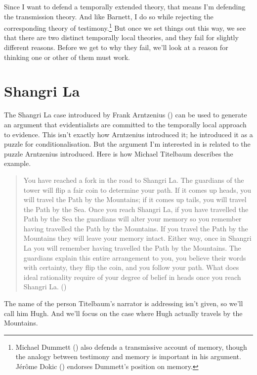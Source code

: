 \documentclass[
  11pt,
  letterpaper,
  DIV=11,
  numbers=noendperiod,
  twoside]{scrartcl}
\begin{document}
Since I want to defend a temporally extended theory, that means I'm
defending the transmission theory. And like Barnett, I do so while
rejecting the corresponding theory of testimony.\footnote{Michael
  Dummett () also defends a transmissive
  account of memory, though the analogy between testimony and memory is
  important in his argument. Jérôme Dokic
  () endorses Dummett's position on
  memory.} But once we set things out this way, we see that there are
two distinct temporally local theories, and they fail for slightly
different reasons. Before we get to why they fail, we'll look at a
reason for thinking one or other of them must work.

\section{Shangri La}\label{shangrila}

The Shangri La case introduced by Frank Arntzenius
() can be used to generate an
argument that evidentialists are committed to the temporally local
approach to evidence. This isn't exactly how Arntzenius introduced it;
he introduced it as a puzzle for conditionalisation. But the argument
I'm interested in is related to the puzzle Arntzenius introduced. Here
is how Michael Titelbaum describes the example.

\begin{quote}
You have reached a fork in the road to Shangri La. The guardians of the
tower will flip a fair coin to determine your path. If it comes up
heads, you will travel the Path by the Mountains; if it comes up tails,
you will travel the Path by the Sea. Once you reach Shangri La, if you
have travelled the Path by the Sea the guardians will alter your memory
so you remember having travelled the Path by the Mountains. If you
travel the Path by the Mountains they will leave your memory intact.
Either way, once in Shangri La you will remember having travelled the
Path by the Mountains. The guardians explain this entire arrangement to
you, you believe their words with certainty, they flip the coin, and you
follow your path. What does ideal rationality require of your degree of
belief in heads once you reach Shangri La.
()
\end{quote}

The name of the person Titelbaum's narrator is addressing isn't given,
so we'll call him Hugh. And we'll focus on the case where Hugh actually
travels by the Mountains.
\end{document}

